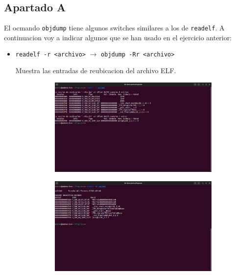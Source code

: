 \documentclass{article}
\begin{document}
\subsection*{Apartado A}

El ocmando \verb|objdump| tiene algunos switches similares a los de \verb|readelf|. A continuacion voy a indicar algunos que se han usado en el ejercicio anterior:

\begin{itemize}
    \item \verb|readelf -r <archivo>| $\rightarrow$ \verb|objdump -Rr <archivo>|
    
    
    Muestra las entradas de reubicacion del archivo ELF.

    \begin{figure}[H]
        \centering
        \begin{subfigure}{0.49\textwidth}
            \centering
            \includegraphics[width=\textwidth]{imagenes/Captura desde 2022-11-17 17-42-30.png}
        \end{subfigure}
        \hfill
        \begin{subfigure}{0.49\textwidth}
            \centering
            \includegraphics[width=\textwidth]{imagenes/Captura desde 2022-11-17 17-42-36.png}
        \end{subfigure}
    \end{figure}


\end{itemize}
\end{document}
